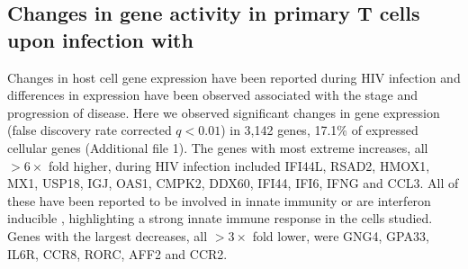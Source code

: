 \documentclass[../sherrill-Mix_thesis.tex]{subfiles}
\begin{document}
		\begin{table}
			\caption[Samples and RNA-Seq sequencing coverage]{Samples used in this study, their infection rates and sequencing depth.}
			\label{tabSamples}
		\end{table}

	\subsection{Changes in gene activity in primary T cells upon infection with \hivEight{}} %
		Changes in host cell gene expression have been reported during HIV infection \citep{Corbeil2001,Mitchell2003,Rotger2010,Lefebvre2011,Imbeault2012,Mohammadi2013} and differences in expression have been observed associated with the stage \citep{Li2009} and progression \citep{Rotger2011} of disease. Here we observed significant changes in gene expression (false discovery rate corrected $q<0.01$) in 3,142 genes, 17.1\% of expressed cellular genes (Additional file 1). The genes with most extreme increases, all $>6\times$ fold higher, during HIV infection included IFI44L, RSAD2, HMOX1, MX1, USP18, IGJ, OAS1, CMPK2, DDX60, IFI44, IFI6, IFNG and CCL3. All of these have been reported to be involved in innate immunity \citep{Breuer2013} or are interferon inducible \citep{Rusinova2013}, highlighting a strong innate immune response in the cells studied. Genes with the largest decreases, all $>3\times$ fold lower, were GNG4, GPA33, IL6R, CCR8, RORC, AFF2 and CCR2.
\end{document}
